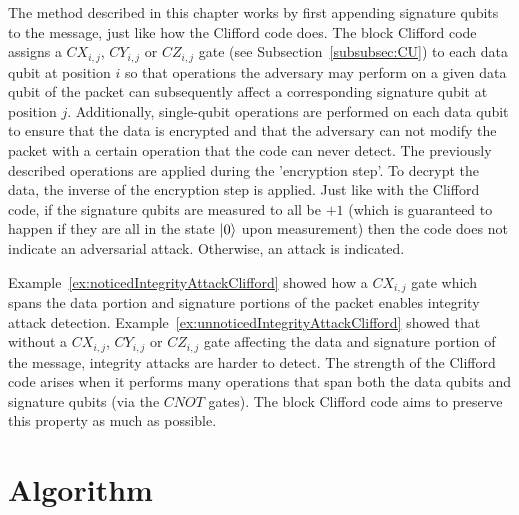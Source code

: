 The method described in this chapter works by first appending signature qubits to the message, just like how the Clifford code does. The block Clifford code assigns a $\mathit{CX}_{i,j}$, $\mathit{CY}_{i,j}$ or $\mathit{CZ}_{i,j}$ gate (see Subsection~\ref{subsubsec:CU}) to each data qubit at position $i$ so that operations the adversary may perform on a given data qubit of the packet can subsequently affect a corresponding signature qubit at position $j$. Additionally, single-qubit operations are performed on each data qubit to ensure that the data is encrypted and that the adversary can not modify the packet with a certain operation that the code can never detect. The previously described operations are applied during the 'encryption step'. To decrypt the data, the inverse of the encryption step is applied. Just like with the Clifford code, if the signature qubits are measured to all be $+1$ (which is guaranteed to happen if they are all in the state $\Ket{0}$ upon measurement) then the code does not indicate an adversarial attack. Otherwise, an attack is indicated.

Example~\ref{ex:noticedIntegrityAttackClifford} showed how a $\mathit{CX}_{i,j}$ gate which spans the data portion and signature portions of the packet enables integrity attack detection. Example~\ref{ex:unnoticedIntegrityAttackClifford} showed that without a $\mathit{CX}_{i,j}$, $\mathit{CY}_{i,j}$ or $\mathit{CZ}_{i,j}$ gate affecting the data and signature portion of the message, integrity attacks are harder to detect. The strength of the Clifford code arises when it performs many operations that span both the data qubits and signature qubits (via the $\mathit{CNOT}$ gates). The block Clifford code aims to preserve this property as much as possible.
\section{Algorithm}
